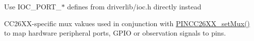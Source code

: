 
\begin{DoxyRefList}
\item[\label{deprecated__deprecated000001}%
\hypertarget{deprecated__deprecated000001}{}%
Module \hyperlink{_p_i_n_c_c26_x_x_8h_amgrp121d71c3ee6f8843829e20de17505c6c}{Device-\/specific pin mux values for C\+C26xx family} ]Use I\+O\+C\+\_\+\+P\+O\+R\+T\+\_\+$\ast$ defines from driverlib/ioc.\+h directly instead

C\+C26\+X\+X-\/specific mux vakues used in conjunction with \hyperlink{_p_i_n_c_c26_x_x_8h_ac8cbb649db80dd03d8e8a487aef43294}{P\+I\+N\+C\+C26\+X\+X\+\_\+set\+Mux()} to map hardware peripheral ports, G\+P\+I\+O or observation signals to pins. 
\end{DoxyRefList}